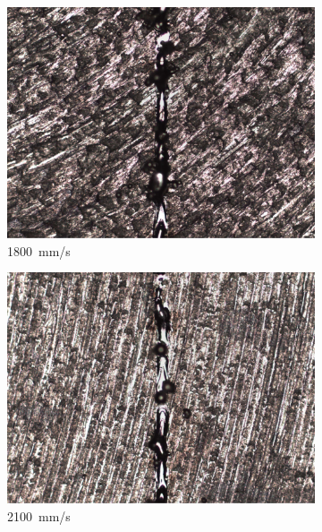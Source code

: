 \documentclass{article}
\begin{document}
\begin{figure}
\begin{subfigure}[b]{0.24\textwidth}
        \includegraphics[width=\textwidth]{experiment/photos/90W_V1800}
        \caption{\SI{1800}{mm/s}}
    \end{subfigure}\:
    \begin{subfigure}[b]{0.24\textwidth}
        \includegraphics[width=\textwidth]{experiment/photos/90W_V2100}
        \caption{\SI{2100}{mm/s}}
    \end{subfigure}\\[6pt]
    \begin{subfigure}[b]{0.24\textwidth}

\end{subfigure}
\end{figure}
\end{document}
